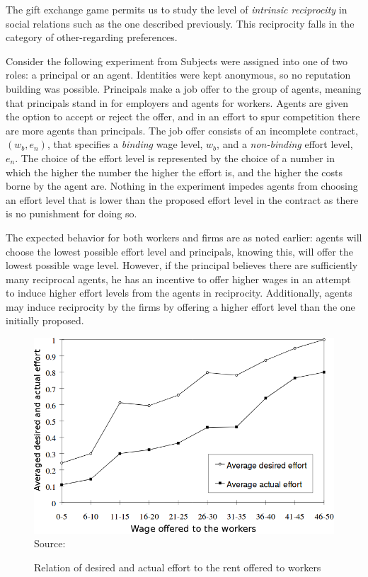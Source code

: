 \documentclass[12pt]{article}
\begin{document}
The gift exchange game permits us to study the level of \textit{intrinsic reciprocity} in social relations such as the one described previously. This reciprocity falls in the category of other-regarding preferences. 

Consider the following experiment from \cite{fehr1997} Subjects were assigned into one of two roles: a principal or an agent. Identities were kept anonymous, so no reputation building was possible. Principals make a job offer to the group of agents, meaning that principals stand in for employers and agents for workers.  Agents are given the option to accept or reject the offer, and in an effort to spur competition there are more agents than principals. The job offer consists of an incomplete contract, $\left ( w_b,e_n \right)$, that specifies a \textit{binding} wage level, $w_b$, and a \textit{non-binding} effort level, $e_n$. The choice of the effort level is represented by the choice of a number in which the higher the number the higher the effort is, and the higher the costs borne by the agent are. Nothing in the experiment impedes agents from choosing an effort level that is lower than the proposed effort level in the contract as there is no punishment for doing so. 

The expected behavior for both workers and firms are as noted earlier: agents will choose the lowest possible effort level and principals, knowing this, will offer the lowest possible wage level. However, if the principal believes there are sufficiently many reciprocal agents, he has an incentive to offer higher wages in an attempt to induce higher effort levels from the agents in reciprocity. Additionally, agents may induce reciprocity by the firms by offering a higher effort level than the one initially proposed.


\begin{figure}[H]
    \centering
    \caption{Relation of desired and actual effort to the rent offered to workers}
    \includegraphics[width=1.\textwidth]{gift1.png}
    Source: \cite{Fehr2002}
    \label{fig:gifteffort}
\end{figure}
\end{document}
